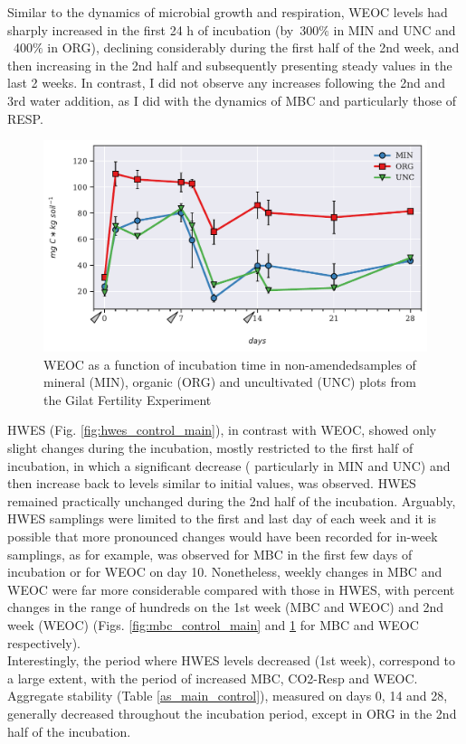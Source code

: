 			\vspace{1cm}
			\noindent Similar to the dynamics of microbial growth and respiration, WEOC  levels had  sharply increased in the first 24 h of incubation (by~300$\%$ in MIN and UNC and ~400$\%$ in ORG), declining considerably during the first half of the 2nd week, and then increasing in the 2nd half and subsequently presenting steady values in the last 2 weeks. In contrast, I did not observe any increases following the 2nd and 3rd water addition, as I did with the dynamics of MBC and particularly those of RESP.  \\


			\begin{figure}[H]
				\centering
				\includegraphics[scale=0.8, width=\linewidth]{thesis_figures/main_incubation/control/WEOC.pdf}
				\caption{WEOC  as a function of incubation time in non-amendedsamples of mineral (MIN), organic (ORG) and uncultivated (UNC) plots from the Gilat Fertility Experiment}
				\label{fig:weoc_control_main}
			\end{figure}

			\noindent HWES (Fig. \ref{fig:hwes_control_main}), in contrast with WEOC, showed only slight changes during the incubation, mostly restricted to the first half of incubation, in which a significant decrease ( particularly in MIN and UNC) and then increase back to levels similar to initial values, was observed. HWES remained practically unchanged during the 2nd half of the incubation. Arguably, HWES samplings were limited to the first and last day of each week and it is possible that more pronounced changes would have been recorded for in-week samplings, as for example, was observed for MBC in the first few days of incubation or for WEOC on day 10. Nonetheless, weekly changes in MBC and WEOC were far more considerable compared with those in HWES, with percent changes in the range of hundreds on the 1st week (MBC and WEOC) and  2nd week (WEOC) (Figs. \ref{fig:mbc_control_main} and \ref{fig:weoc_control_main} for MBC and WEOC respectively). \\
			Interestingly, the period where HWES levels decreased (1st week), correspond to a large extent, with the period of increased MBC, CO2-Resp and WEOC.\\
			Aggregate stability (Table \ref{as_main_control}), measured on days 0, 14 and 28, generally decreased throughout the incubation period, except in ORG in the 2nd half of the incubation.


